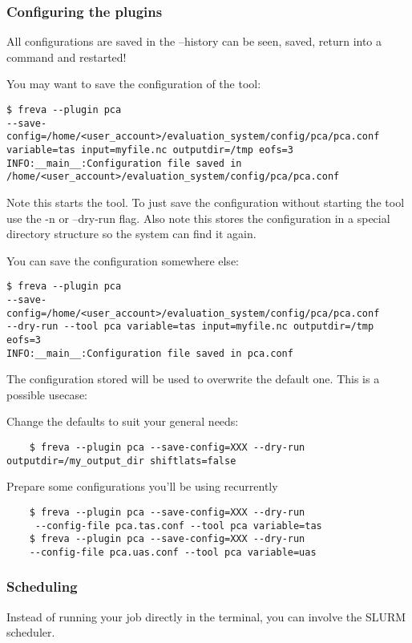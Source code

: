 \documentclass[a4paper,11pt]{ltxdoc}
\begin{document}
\subsubsection*{Configuring the plugins}

All configurations are saved in the --history can be seen, saved, return into a command and restarted!

You may want to save the configuration of the tool:
\begin{verbatim}
$ freva --plugin pca 
--save-config=/home/<user_account>/evaluation_system/config/pca/pca.conf 
variable=tas input=myfile.nc outputdir=/tmp eofs=3 
INFO:__main__:Configuration file saved in 
/home/<user_account>/evaluation_system/config/pca/pca.conf
\end{verbatim}

Note this starts the tool. To just save the configuration without starting the tool use the -n or --dry-run flag.
Also note this stores the configuration in a special directory structure so the system can find it again.

You can save the configuration somewhere else:
\begin{verbatim}
$ freva --plugin pca 
--save-config=/home/<user_account>/evaluation_system/config/pca/pca.conf 
--dry-run --tool pca variable=tas input=myfile.nc outputdir=/tmp eofs=3
INFO:__main__:Configuration file saved in pca.conf
\end{verbatim}
The configuration stored will be used to overwrite the default one. This is a possible usecase:

Change the defaults to suit your general needs:
\begin{verbatim}
    $ freva --plugin pca --save-config=XXX --dry-run outputdir=/my_output_dir shiftlats=false
\end{verbatim}
    Prepare some configurations you'll be using recurrently
\begin{verbatim}
    $ freva --plugin pca --save-config=XXX --dry-run 
     --config-file pca.tas.conf --tool pca variable=tas
    $ freva --plugin pca --save-config=XXX --dry-run 
    --config-file pca.uas.conf --tool pca variable=uas
\end{verbatim}

\subsubsection*{Scheduling}

Instead of running your job directly in the terminal, you can involve the SLURM scheduler.
\end{document}
